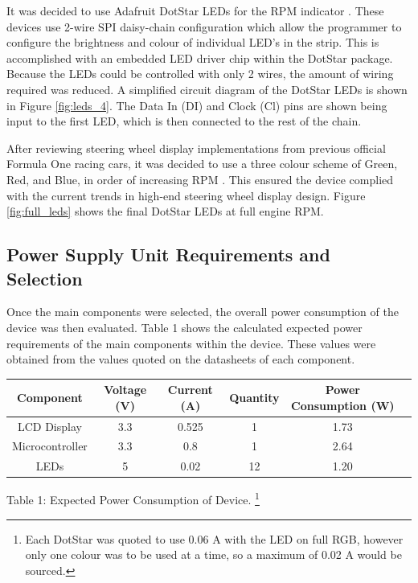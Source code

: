 \documentclass[a4paper,12pt]{article}
\begin{document}
It was decided to use Adafruit DotStar LEDs for the RPM indicator \cite{dotstar_datasheet}. These devices use 2-wire SPI daisy-chain configuration which allow the programmer to configure the brightness and colour of individual LED’s in the strip. This is accomplished with an embedded LED driver chip within the DotStar package. Because the LEDs could be controlled with only 2 wires, the amount of wiring required was reduced. A simplified circuit diagram of the DotStar LEDs is shown in Figure \ref{fig:leds_4}. The Data In (DI) and Clock (Cl) pins are shown being input to the first LED, which is then connected to the rest of the chain.



After reviewing steering wheel display implementations from previous official Formula One racing cars, it was decided to use a three colour scheme of Green, Red, and Blue, in order of increasing RPM \cite{bsim_racing, daily_mail_1}. This ensured the device complied with the current trends in high-end steering wheel display design. Figure \ref{fig:full_leds} shows the final DotStar LEDs at full engine RPM.



\newpage
\subsection{Power Supply Unit Requirements and Selection}
\label{sec:PSU}

Once the main components were selected, the overall power consumption of the device was then evaluated. Table 1 shows the calculated expected power requirements of the main components within the device. These values were obtained from the values quoted on the datasheets of each component.

\begin{center}
\begin{tabular}{ | c | c | c | c | c | c | }
\hline
 Component & Voltage (V) & Current (A) & Quantity & Power Consumption (W) \\
\hline
 LCD Display & 3.3 & 0.525 & 1 & 1.73 \\
\hline
 Microcontroller & 3.3 & 0.8 & 1 & 2.64 \\
\hline
 LEDs & 5 & 0.02 & 12 & 1.20 \\
\hline
\end{tabular}
\par
\bigskip
Table 1: Expected Power Consumption of Device. \footnote{Each DotStar was quoted to use 0.06 A with the LED on full RGB, however only one colour was to be used at a time, so a maximum of 0.02 A would be sourced.}
\end{center}
\end{document}
